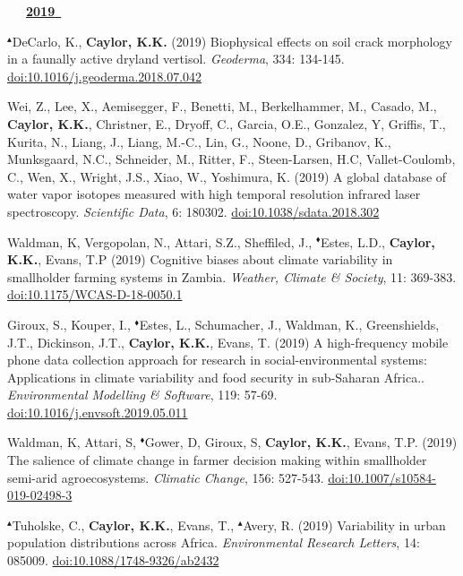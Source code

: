 \begin{etaremune}
\vspace{0.1in}
\mbox{\ \ \ \underline{\textbf{2019 }}}
\vspace{0.1in}

\item $^{\blacktriangle}$DeCarlo, K., \textbf{ Caylor, K.K.} (2019) Biophysical effects on soil crack morphology in a faunally active dryland vertisol. \emph{Geoderma}, 334: 134-145. \href{https://doi.org/10.1016/j.geoderma.2018.07.042}{doi:10.1016/j.geoderma.2018.07.042}
\item Wei, Z., Lee, X., Aemisegger, F., Benetti, M., Berkelhammer, M., Casado, M., \textbf{ Caylor, K.K.}, Christner, E., Dryoff, C., Garcia, O.E., Gonzalez, Y, Griffis, T., Kurita, N., Liang, J., Liang, M.-C., Lin, G., Noone, D., Gribanov, K., Munksgaard, N.C., Schneider, M., Ritter, F., Steen-Larsen, H.C, Vallet-Coulomb, C., Wen, X., Wright, J.S., Xiao, W., Yoshimura, K. (2019) A global database of water vapor isotopes measured with high temporal resolution infrared laser spectroscopy. \emph{Scientific Data}, 6: 180302. \href{https://doi.org/10.1038/sdata.2018.302}{doi:10.1038/sdata.2018.302}
\item Waldman, K, Vergopolan, N., Attari, S.Z., Sheffiled, J., $^{\blacklozenge}$Estes, L.D., \textbf{ Caylor, K.K.}, Evans, T.P (2019) Cognitive biases about climate variability in smallholder farming systems in Zambia. \emph{Weather, Climate \& Society}, 11: 369-383. \href{https://doi.org/10.1175/WCAS-D-18-0050.1}{doi:10.1175/WCAS-D-18-0050.1}
\item Giroux, S., Kouper, I., $^{\blacklozenge}$Estes, L., Schumacher, J., Waldman, K., Greenshields, J.T., Dickinson, J.T., \textbf{ Caylor, K.K.}, Evans, T. (2019) A high-frequency mobile phone data collection approach for research in social-environmental systems: Applications in climate variability and food security in sub-Saharan Africa.. \emph{Environmental Modelling \& Software}, 119: 57-69. \href{https://doi.org/10.1016/j.envsoft.2019.05.011}{doi:10.1016/j.envsoft.2019.05.011}
\item Waldman, K, Attari, S, $^{\blacklozenge}$Gower, D, Giroux, S, \textbf{ Caylor, K.K.}, Evans, T.P. (2019) The salience of climate change in farmer decision making within smallholder semi-arid agroecosystems. \emph{Climatic Change}, 156: 527-543. \href{https://doi.org/10.1007/s10584-019-02498-3}{doi:10.1007/s10584-019-02498-3}
\item $^{\blacktriangle}$Tuholske, C., \textbf{ Caylor, K.K.}, Evans, T., $^{\blacktriangle}$Avery, R. (2019) Variability in urban population distributions across Africa. \emph{Environmental Research Letters}, 14: 085009. \href{https://doi.org/10.1088/1748-9326/ab2432}{doi:10.1088/1748-9326/ab2432}


\end{etaremune}
